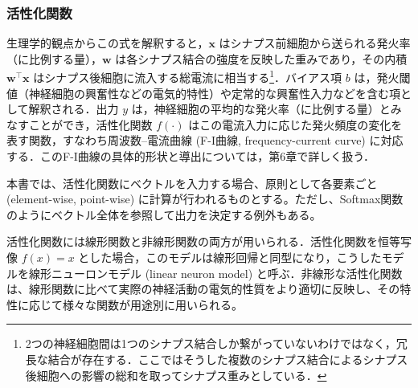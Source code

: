 \documentclass[titlepage]{ltjsbook}
\begin{document}
\subsubsection{活性化関数}
生理学的観点からこの式を解釈すると，$\mathbf{x}$ はシナプス前細胞から送られる発火率（に比例する量），$\mathbf{w}$ は各シナプス結合の強度を反映した重みであり，その内積 $\mathbf{w}^\top \mathbf{x}$ はシナプス後細胞に流入する総電流に相当する\footnote{2つの神経細胞間は1つのシナプス結合しか繋がっていないわけではなく，冗長な結合が存在する．ここではそうした複数のシナプス結合によるシナプス後細胞への影響の総和を取ってシナプス重みとしている．}．バイアス項 $b$ は，発火閾値（神経細胞の興奮性などの電気的特性）や定常的な興奮性入力などを含む項として解釈される．出力 $y$ は，神経細胞の平均的な発火率（に比例する量）とみなすことができ，活性化関数 $f(\cdot)$ はこの電流入力に応じた発火頻度の変化を表す関数，すなわち周波数–電流曲線 (F-I曲線, frequency-current curve) に対応する．このF-I曲線の具体的形状と導出については，第6章で詳しく扱う．

本書では、活性化関数にベクトルを入力する場合、原則として各要素ごと (element-wise, point-wise) に計算が行われるものとする。ただし、Softmax関数のようにベクトル全体を参照して出力を決定する例外もある。

活性化関数には線形関数と非線形関数の両方が用いられる．活性化関数を恒等写像 $f(x) = x$ とした場合，このモデルは線形回帰と同型になり，こうしたモデルを線形ニューロンモデル (linear neuron model) と呼ぶ．非線形な活性化関数は、線形関数に比べて実際の神経活動の電気的性質をより適切に反映し、その特性に応じて様々な関数が用途別に用いられる。
\end{document}

